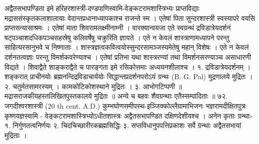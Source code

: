 अद्वैतसभापण्डिता इमे हरिहरशास्त्री-दण्डपाणिस्वामि-वेङ्कटरामशास्त्रिभ्यः प्राप्तविद्याः मद्राससंस्कृतकलाशालायाः वेदान्तप्रधानाध्यापकाश्च राजन्ते स्म । एतेषां पिता सुन्दरशास्त्री स्वस्यापरे वयसि प्राप्तसन्यासाश्रमः । एतेषां माता शिवरामलक्ष्मीनाम्नी । वारक्यान्वयजा एते स्वग्रन्थं द्रविडात्रेयदर्शनं षट्पञ्चाशदधिकपञ्चसहस्रेषु कलिवर्षेषु चक्रुरिति ज्ञायते ।
एते न केवलं शास्त्राणामध्यापने परन्तु साहित्यरसानुभवे च निष्णाताः । शास्त्रज्ञत्वकवित्वयोस्सुन्दरसामञ्जस्यमेतेषु महान् विशेषः । एते न केवलं दर्शनतत्वज्ञाः परन्तु विमर्शकवरेण्याश्च । एतेषां प्रतिभा यथा शास्त्ररण्यां तथा विमर्शनसरण्याञ्च असाधारणी विद्यते । शिवाद्वैते शाङ्कराद्वैते च पारङ्गता इमे रसिकोत्तमाः अध्ययनशीलाश्च ।
१. द्रविडात्रेयदर्शनम् । शङ्करात् प्राचीनयोः ब्रह्मनन्दिद्रविडाचार्ययोः सिद्धान्तप्रदर्शनपरोऽयं ग्रन्थः (B. G. Pal) मुद्रणालये मुद्रितः ।
२. चतुर्मतसामरस्यम् । कामकोटिकोशस्थाने मुद्रितः ।
३. आभोगटिप्पणी ॥ मद्रासराजकीयहस्तलिखितपुस्तकालये मुद्रितः ॥
अन्ये च बहवः शैवग्रन्थाः एतैस्सम्पादिताः ॥
७२. जगदीश्वरशास्त्री (20 th cent. A.D.)
कुम्भघोणसमीपस्थ-इञ्जिक्कोल्लैग्रामाभिजनः भज्ञरामदीक्षितपुत्रः कृष्णयज्ञस्वामि - वेङ्कटरामशास्त्रिभ्योऽधीतशास्त्रः अद्वैतसभापण्डित दक्षिणदेशीयश्च । अनेन कृताः ग्रन्थाः- १. निर्गुणतत्वनिर्णयः २. चिदचिच्छारीरकब्रह्मसिद्धिः ३. सप्तविधानुपपत्तिप्रकाशः सर्वे ग्रन्थाः अद्वैतसभायां मुद्रिताः ।
